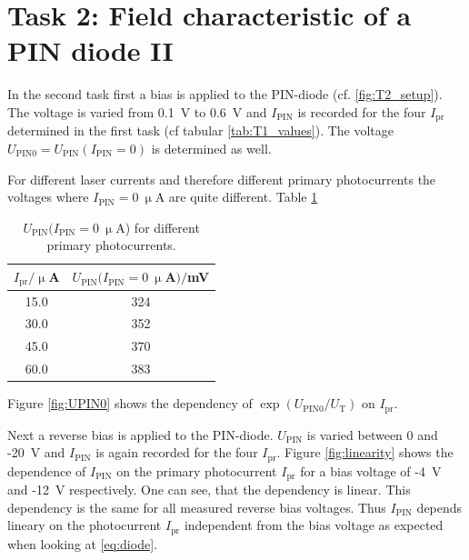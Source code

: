 \section{Task 2: Field characteristic of a PIN diode II}

In the second task first a bias is applied to the PIN-diode (cf. \ref{fig:T2_setup}). The voltage is varied from 0.1~V to 0.6~V and  $I_{\mathrm{PIN}}$ is recorded for the four $I_{\mathrm{pr}}$ determined in the first task (cf tabular \ref{tab:T1_values}). The voltage $U_{\mathrm{PIN0}} = U_{\mathrm{PIN}}(I_{\mathrm{PIN}}=0)$ is determined as well. 

For different laser currents and therefore different primary photocurrents the voltages where $I_{\mathrm{PIN}} = 0~\upmu$A are quite different.
Table \ref{tab:T2_voltage}


\begin{table}%
\centering
\caption{$U_{\mathrm{PIN}}(I_{\mathrm{PIN}}=0~\upmu$A) for different primary photocurrents.}

\begin{tabular}{cc}

\toprule
$I_{\mathrm{pr}} / \upmu$A & $U_{\mathrm{PIN}}(I_{\mathrm{PIN}} = 0~\upmu$A$) /$mV\\

\midrule
15.0 & 324\\
30.0 & 352\\
45.0 & 370\\
60.0 & 383\\

\bottomrule 
\end{tabular}
\label{tab:T2_voltage}
\end{table}



Figure \ref{fig:UPIN0} shows the dependency of $\exp(U_{\mathrm{PIN0}}/U_{\mathrm{T}})$ on $I_{\mathrm{pr}}$. 

Next a reverse bias is applied to the PIN-diode. $U_{\mathrm{PIN}}$ is varied between 0 and -20~V and $I_{\mathrm{PIN}}$ is again recorded for the four $I_{\mathrm{pr}}$. Figure \ref{fig:linearity} shows the dependence of $I_{\mathrm{PIN}}$ on the primary photocurrent $I_{\mathrm{pr}}$ for a bias voltage of -4~V and -12~V respectively. One can see, that the dependency is linear. This dependency is the same for all measured reverse bias voltages. Thus $I_{\mathrm{PIN}}$ depends lineary on the photocurrent $I_{\mathrm{pr}}$ independent from the bias voltage as expected when looking at \eqref{eq:diode}.

